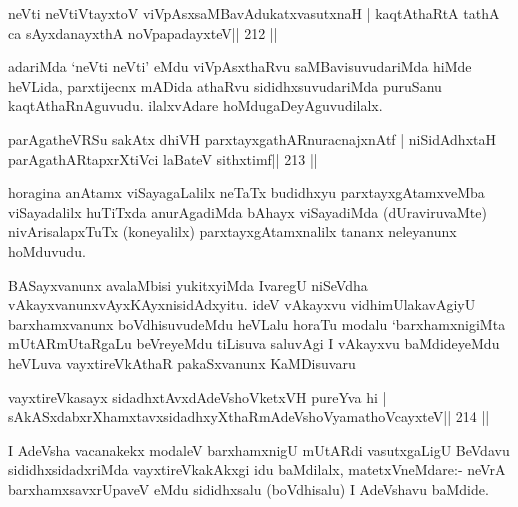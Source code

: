 
\begin{shl}
neVti neVtiVtayxtoV viVpAsxsaMBavAdukatxvasutxnaH |
kaqtAthaRtA tathA ca sAyxdanayxthA noVpapadayxteV\hfill || 212 ||
\end{shl}

\begin{artha}
adariMda `neVti neVti' eMdu viVpAsxthaRvu saMBavisuvudariMda hiMde heVLida, parxtijecnx mADida athaRvu sididhxsuvudariMda puruSanu kaqtAthaRnAguvudu. ilalxvAdare hoMdugaDeyAguvudilalx.
\end{artha}


\begin{shl}
parAgatheVRSu sakAtx dhiVH parxtayxgathARnuracnajxnAtf |
niSidAdhx\s taH parAgathARtapxrXtiVci laBateV sithxtimf\hfill || 213 ||
\end{shl}

\begin{artha}
horagina anAtamx viSayagaLalilx neTaTx budidhxyu parxtayxgAtamxveMba
viSayadalilx huTiTxda anurAgadiMda bAhayx viSayadiMda (dUraviruvaMte)
nivArisalapxTuTx (koneyalilx) parxtayxgAtamxnalilx tananx neleyanunx hoMduvudu.
\end{artha}


\begin{artha}
BASayxvanunx avalaMbisi yukitxyiMda IvaregU niSeVdha
vAkayxvanunx\break vAyxKAyxnisidAdxyitu. ideV vAkayxvu vidhimUlakavAgiyU
barxhamxvanunx boVdhisuvudeMdu heVLalu horaTu modalu `barxhamxnigiMta
mUtARmUtaRgaLu beVreyeMdu tiLisuva saluvAgi I vAkayxvu baMdideyeMdu
heVLuva vayxtireVkAthaR pakaSxvanunx KaMDisuvaru  \mdash 
\end{artha}

\begin{shl}
vayxtireVkasayx sidadhxtAvxdAdeVshoVketxVH pureYva hi |
sAkASxdabxrXhamxtavxsidadhxyXthaRmAdeVshoV\s yamathoVcayxteV\hfill || 214 ||
\end{shl}

\begin{artha}
I AdeVsha vacanakekx modaleV barxhamxnigU mUtARdi vasutxgaLigU BeVdavu sididhxsidadxriMda vayxtireVkakAkxgi idu baMdilalx, matetxVneMdare:- neVrA barxhamxsavxrUpaveV eMdu sididhxsalu (boVdhisalu) I AdeVshavu baMdide.
\end{artha}

